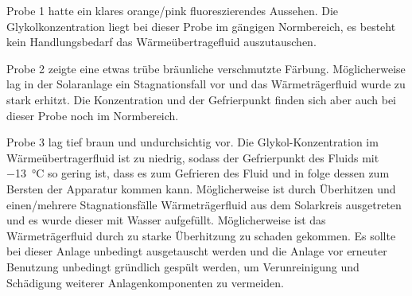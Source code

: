 Probe 1 hatte ein klares orange/pink fluoreszierendes Aussehen. Die Glykolkonzentration liegt bei dieser Probe im gängigen Normbereich, es besteht kein Handlungsbedarf das Wärmeübertragefluid auszutauschen. 

Probe 2 zeigte eine etwas trübe bräunliche verschmutzte Färbung. Möglicherweise lag in der Solaranlage ein Stagnationsfall vor und das Wärmeträgerfluid wurde zu stark erhitzt. Die Konzentration und der Gefrierpunkt finden sich aber auch bei dieser Probe noch im Normbereich. 

Probe 3 lag tief braun und undurchsichtig vor.  Die Glykol-Konzentration im Wärmeübertragerfluid ist zu niedrig, sodass der Gefrierpunkt des Fluids mit \SI{-13}{\celsius} so gering ist, dass es zum Gefrieren des Fluid und in folge dessen zum Bersten der Apparatur kommen kann. Möglicherweise ist durch Überhitzen und einen/mehrere Stagnationsfälle Wärmeträgerfluid aus dem Solarkreis ausgetreten und es wurde dieser mit Wasser aufgefüllt. Möglicherweise ist das Wärmeträgerfluid durch zu starke Überhitzung zu schaden gekommen. Es sollte bei dieser Anlage unbedingt ausgetauscht werden und die Anlage vor erneuter Benutzung unbedingt gründlich gespült werden, um Verunreinigung und Schädigung weiterer Anlagenkomponenten zu vermeiden. 